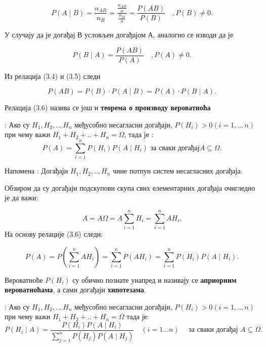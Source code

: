 \begin{equation}
 P( A \mid B ) = \frac{n_{AB}}{n_B} = \frac{\frac{n_{AB}}{n}}{\frac{n_B}{n}} = \frac{P(AB)}{P(B)} \quad ,  P(B) \neq 0.
\end{equation}

У случају да је догађај В условљен догађајом А, аналогно се изводи да је 

\begin{equation}
 P( B \mid A ) = \frac{P(AB)}{P(A)} \quad ,  P(A) \neq 0.
\end{equation}

Из релација (3.4) и (3.5) следи

\begin{equation}
 P( AB ) = P(B)\cdot  P( A \mid B ) = P(A)\cdot  P( B \mid A ) .
\end{equation}

Релација (3.6) назива се још и \textbf{теорема о производу вероватноћа}

\begin{te}
 : 
Ако су $H_1,H_2,..,H_n$ међусобно несагласни догађаји, $P(H_i) > 0 (i=1,..,n)$ при чему важи $H_1+H_2+..+H_n = \Omega $, тада је :
\begin{equation}
	 P(A) = \sum_{i=1}^n P(H_i)P(A \mid H_i)  \textrm{ за сваки догађај}  A \subseteq  \Omega.
\end{equation}
\end{te}
Напомена : Догађаји $H_1,H_2,..,H_n$ чине потпун систем несагласних догађаја.

\begin{dok}
Обзиром да су догађаји подскупови скупа свих елементарних догађаја очигледно је да важи:

\begin{equation}
A = A\Omega = A \sum_{i=1}^n H_i = \sum_{i=1}^n AH_i. 
\end{equation}
На основу релације (3.6) следи:

\begin{equation}
P(A) = P(\sum_{i=1}^n AH_i) = \sum_{i=1}^n P(AH_i) = \sum_{i=1}^n P(H_i)P(A \mid H_i).
\end{equation}
\end{dok}

Вероватноће $P(H_i)$ су обично познате унапред и називају се \textbf{априорним вероватноћама}, а сами догађаји \textbf{хипотезама}. 

\begin{te}
: 
Ако су $H_1,H_2,..,H_n$ међусобно несагласни догађаји, $P(H_i) > 0        (i=1,..,n)$ при чему важи $H_1+H_2+..+H_n = \Omega $ тада је:
\begin{equation}
	 P(H_i \mid A ) = \frac{P(H_i)P(A \mid H_i)}{ \sum_{j=1}^n P(H_j)P(A \mid H_j)}  \quad   (i=1...n)  \quad  \textrm{ за сваки догађај }  A \subseteq  \Omega.
\end{equation}
\end{te}

